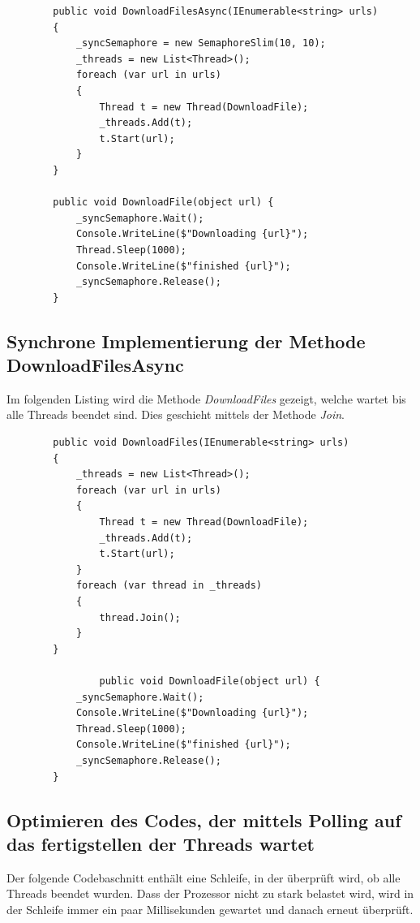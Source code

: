 \documentclass[a4paper,ngerman]{scrartcl}
\begin{document}
\begin{lstlisting}
        public void DownloadFilesAsync(IEnumerable<string> urls)
        {
            _syncSemaphore = new SemaphoreSlim(10, 10);
            _threads = new List<Thread>();
            foreach (var url in urls)
            {
                Thread t = new Thread(DownloadFile);
                _threads.Add(t);
                t.Start(url);
            }
        }

        public void DownloadFile(object url) {
            _syncSemaphore.Wait();
            Console.WriteLine($"Downloading {url}");
            Thread.Sleep(1000);
            Console.WriteLine($"finished {url}");
            _syncSemaphore.Release();
        }
\end{lstlisting} 

\subsection{Synchrone Implementierung der Methode DownloadFilesAsync}

Im folgenden Listing wird die Methode \textit{DownloadFiles} gezeigt, welche 
wartet bis alle Threads beendet sind. Dies geschieht mittels der Methode \textit{Join}.

\begin{lstlisting}
        public void DownloadFiles(IEnumerable<string> urls)
        {
            _threads = new List<Thread>();
            foreach (var url in urls)
            {
                Thread t = new Thread(DownloadFile);
                _threads.Add(t);
                t.Start(url);
            }
            foreach (var thread in _threads)
            {
                thread.Join();
            }
        }
				
				public void DownloadFile(object url) {
            _syncSemaphore.Wait();
            Console.WriteLine($"Downloading {url}");
            Thread.Sleep(1000);
            Console.WriteLine($"finished {url}");
            _syncSemaphore.Release();
        }
\end{lstlisting} 

\subsection{Optimieren des Codes, der mittels Polling auf das fertigstellen der Threads wartet}

Der folgende Codebaschnitt enthält eine Schleife, in der überprüft wird, ob alle Threads beendet wurden.
Dass der Prozessor nicht zu stark belastet wird, wird in der Schleife immer ein paar Millisekunden gewartet
und danach erneut überprüft.
\end{document}
